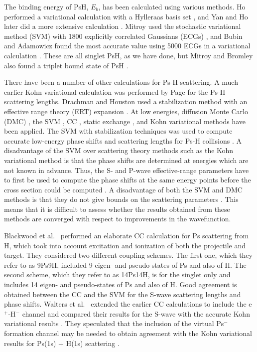 \documentclass[preprint,showpacs,preprintnumbers,amsmath,amssymb,longbibliography,pra,aps]{revtex4-1}
\begin{document}
The binding energy of PsH, $E_b$, has been calculated using various methods. Ho performed a variational calculation with a Hylleraas basis set \cite{Ho1986}, and Yan and Ho later did a more extensive calculation \cite{Yan1999}. Mitroy used the stochastic variational method (SVM) with 1800 explicitly correlated Gaussians (ECGs) \cite{Mitroy2006}, and Bubin and Adamowicz found the most accurate value using 5000 ECGs in a variational calculation \cite{Bubin2006}. These are all singlet PsH, as we have done, but Mitroy and Bromley also found a triplet bound state of PsH \cite{Mitroy2007}.

There have been a number of other calculations for
Ps-H scattering. A much earlier Kohn variational calculation was performed
by Page \cite{Page1976} for the Ps-H scattering lengths. Drachman and Houston used a stabilization method with an effective range theory (ERT) expansion \cite{Drachman1975,Drachman1976}.
At low energies, diffusion Monte Carlo (DMC) \cite{Chiesa2002},
the SVM \cite{Ivanov2001,Ivanov2002}, CC \cite{Sinha1997,Campbell1998,Adhikari1999,Sinha2000,Blackwood2002,Blackwood2002b,Walters2004}, static exchange \cite{Hara1975,Ray1997}, and Kohn variational \cite{Page1976,VanReeth2003,VanReeth2004} methods have been applied.
The SVM with stabilization techniques was used to compute
accurate low-energy phase shifts and scattering lengths for Ps-H collisions \cite{Ivanov2001,Ivanov2002}.
A disadvantage of the SVM over scattering theory methods
such as the Kohn variational method is that the phase shifts
are determined at energies which are not known in advance.
Thus, the S- and P-wave
effective-range parameters have to first be used to compute the phase shifts at the same energy
points before the cross section could be computed \cite{Ivanov2002}. 
A disadvantage of both the SVM 
and DMC methods is that they do not give
bounds on the scattering parameters \cite{VanReeth2003}.
This means that it is difficult to assess whether the results
obtained from these methods are converged with respect
to improvements in the wavefunction.

Blackwood et al.~\cite{Blackwood2002} performed an elaborate CC calculation for Ps scattering from H, which took into account excitation and ionization of both the projectile and target. They considered two different coupling schemes.
The first one, which they refer to as 9Ps9H, included 9 eigen- and pseudo-states of Ps and also of H. The second scheme, which they refer to as 14Ps14H, is for the singlet only and includes 14 eigen- and pseudo-states of Ps and also of H.
Good agreement is obtained between the CC \cite{Blackwood2002} and the SVM \cite{Ivanov2002}
for the S-wave scattering lengths and phase shifts. Walters et al.~\cite{Walters2004} extended the earlier CC calculations \cite{Blackwood2002} to include the e$^+$-H$^-$ channel \cite{Blackwood2002b} and compared their results for the S-wave with the accurate
Kohn variational results \cite{VanReeth2003}.
They speculated that the inclusion of the virtual Ps$^-$ formation channel may
be needed to obtain agreement with the Kohn variational results
for Ps(1s) + H(1s) scattering \cite{Blackwood2002}.
\end{document}
